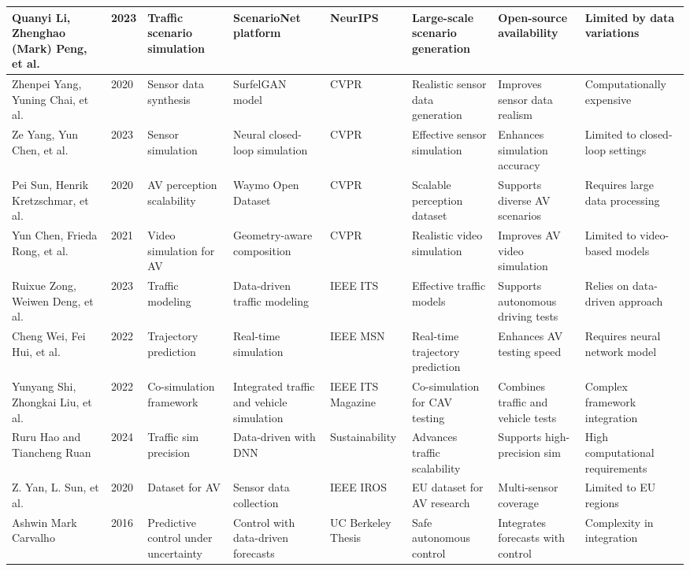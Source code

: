\documentclass[lettersize,journal]{IEEEtran}
\begin{document}
\begin{longtable}{|p{2cm}|p{1cm}|p{2cm}|p{2cm}|p{2cm}|p{2cm}|p{2cm}|p{2.5cm}|}
Quanyi Li, Zhenghao (Mark) Peng, et al. & 2023 & Traffic scenario simulation & ScenarioNet platform & NeurIPS & Large-scale scenario generation & Open-source availability & Limited by data variations \\
\hline
Zhenpei Yang, Yuning Chai, et al. & 2020 & Sensor data synthesis & SurfelGAN model & CVPR & Realistic sensor data generation & Improves sensor data realism & Computationally expensive \\
\hline
Ze Yang, Yun Chen, et al. & 2023 & Sensor simulation & Neural closed-loop simulation & CVPR & Effective sensor simulation & Enhances simulation accuracy & Limited to closed-loop settings \\
\hline
Pei Sun, Henrik Kretzschmar, et al. & 2020 & AV perception scalability & Waymo Open Dataset & CVPR & Scalable perception dataset & Supports diverse AV scenarios & Requires large data processing \\
\hline
Yun Chen, Frieda Rong, et al. & 2021 & Video simulation for AV & Geometry-aware composition & CVPR & Realistic video simulation & Improves AV video simulation & Limited to video-based models \\
\hline
Ruixue Zong, Weiwen Deng, et al. & 2023 & Traffic modeling & Data-driven traffic modeling & IEEE ITS & Effective traffic models & Supports autonomous driving tests & Relies on data-driven approach \\
\hline
Cheng Wei, Fei Hui, et al. & 2022 & Trajectory prediction & Real-time simulation & IEEE MSN & Real-time trajectory prediction & Enhances AV testing speed & Requires neural network model \\
\hline
Yunyang Shi, Zhongkai Liu, et al. & 2022 & Co-simulation framework & Integrated traffic and vehicle simulation & IEEE ITS Magazine & Co-simulation for CAV testing & Combines traffic and vehicle tests & Complex framework integration \\
\hline
Ruru Hao and Tiancheng Ruan & 2024 & Traffic sim precision & Data-driven with DNN & Sustainability & Advances traffic scalability & Supports high-precision sim & High computational requirements \\
\hline
Z. Yan, L. Sun, et al. & 2020 & Dataset for AV & Sensor data collection & IEEE IROS & EU dataset for AV research & Multi-sensor coverage & Limited to EU regions \\
\hline
Ashwin Mark Carvalho & 2016 & Predictive control under uncertainty & Control with data-driven forecasts & UC Berkeley Thesis & Safe autonomous control & Integrates forecasts with control & Complexity in integration \\

\end{longtable}
\end{document}
